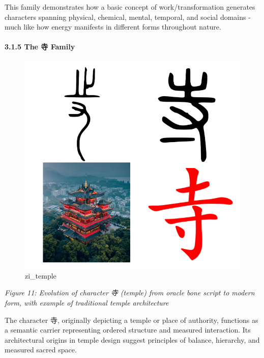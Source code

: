 This family demonstrates how a basic concept of work/transformation
generates characters spanning physical, chemical, mental, temporal, and
social domains - much like how energy manifests in different forms
throughout nature.

\hypertarget{the-ux5bfa-family}{%
\paragraph{3.1.5 The 寺 Family}\label{the-ux5bfa-family}}

\begin{figure}
\centering
\includegraphics{./images/zi_temple.png}
\caption{zi\_temple}
\end{figure}

\emph{Figure 11: Evolution of character 寺 (temple) from oracle bone
script to modern form, with example of traditional temple architecture}

The character 寺, originally depicting a temple or place of authority,
functions as a semantic carrier representing ordered structure and
measured interaction. Its architectural origins in temple design suggest
principles of balance, hierarchy, and measured sacred space.

